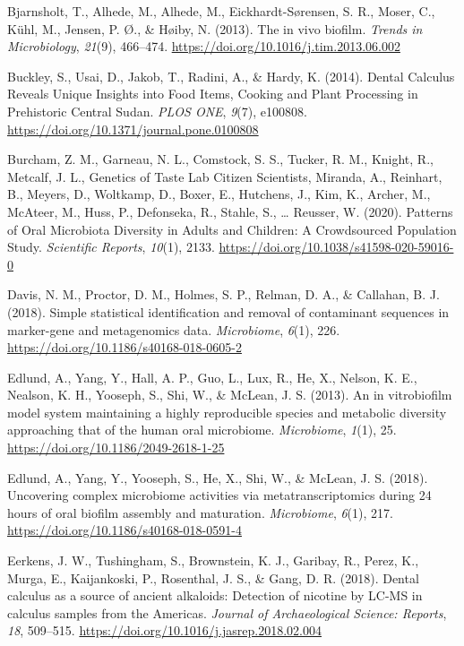 \documentclass[
  b5paper,
]{book}
\newlength{\cslhangindent}
\newenvironment{CSLReferences}[2] %
 {\begin{list}{}{%
  \setlength{\itemindent}{0pt}
  \setlength{\leftmargin}{0pt}
  \setlength{\parsep}{0pt}
  \ifodd #1
   \setlength{\leftmargin}{\cslhangindent}
   \setlength{\itemindent}{-1\cslhangindent}
  \fi
  \setlength{\itemsep}{#2\baselineskip}}}
 {\end{list}}
\begin{document}
\begin{CSLReferences}{1}{0}
Bjarnsholt, T., Alhede, M., Alhede, M., Eickhardt-Sørensen, S. R.,
Moser, C., Kühl, M., Jensen, P. Ø., \& Høiby, N. (2013). The in vivo
biofilm. \emph{Trends in Microbiology}, \emph{21}(9), 466--474.
\url{https://doi.org/10.1016/j.tim.2013.06.002}

Buckley, S., Usai, D., Jakob, T., Radini, A., \& Hardy, K. (2014).
Dental {Calculus Reveals Unique Insights} into {Food Items}, {Cooking}
and {Plant Processing} in {Prehistoric Central Sudan}. \emph{PLOS ONE},
\emph{9}(7), e100808. \url{https://doi.org/10.1371/journal.pone.0100808}

Burcham, Z. M., Garneau, N. L., Comstock, S. S., Tucker, R. M., Knight,
R., Metcalf, J. L., Genetics of Taste Lab Citizen Scientists, Miranda,
A., Reinhart, B., Meyers, D., Woltkamp, D., Boxer, E., Hutchens, J.,
Kim, K., Archer, M., McAteer, M., Huss, P., Defonseka, R., Stahle, S.,
\ldots{} Reusser, W. (2020). Patterns of {Oral Microbiota Diversity} in
{Adults} and {Children}: {A Crowdsourced Population Study}.
\emph{Scientific Reports}, \emph{10}(1), 2133.
\url{https://doi.org/10.1038/s41598-020-59016-0}

Davis, N. M., Proctor, D. M., Holmes, S. P., Relman, D. A., \& Callahan,
B. J. (2018). Simple statistical identification and removal of
contaminant sequences in marker-gene and metagenomics data.
\emph{Microbiome}, \emph{6}(1), 226.
\url{https://doi.org/10.1186/s40168-018-0605-2}

Edlund, A., Yang, Y., Hall, A. P., Guo, L., Lux, R., He, X., Nelson, K.
E., Nealson, K. H., Yooseph, S., Shi, W., \& McLean, J. S. (2013). An in
vitrobiofilm model system maintaining a highly reproducible species and
metabolic diversity approaching that of the human oral microbiome.
\emph{Microbiome}, \emph{1}(1), 25.
\url{https://doi.org/10.1186/2049-2618-1-25}

Edlund, A., Yang, Y., Yooseph, S., He, X., Shi, W., \& McLean, J. S.
(2018). Uncovering complex microbiome activities via metatranscriptomics
during 24 hours of oral biofilm assembly and maturation.
\emph{Microbiome}, \emph{6}(1), 217.
\url{https://doi.org/10.1186/s40168-018-0591-4}

Eerkens, J. W., Tushingham, S., Brownstein, K. J., Garibay, R., Perez,
K., Murga, E., Kaijankoski, P., Rosenthal, J. S., \& Gang, D. R. (2018).
Dental calculus as a source of ancient alkaloids: {Detection} of
nicotine by {LC-MS} in calculus samples from the {Americas}.
\emph{Journal of Archaeological Science: Reports}, \emph{18}, 509--515.
\url{https://doi.org/10.1016/j.jasrep.2018.02.004}


\end{CSLReferences}
\end{document}
